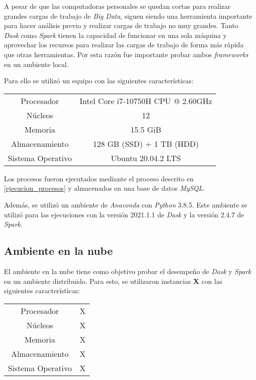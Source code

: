 A pesar de que las computadoras personales se quedan cortas para realizar grandes cargas de trabajo de \textit{Big Data}, siguen siendo una herramienta importante para hacer análisis previo y realizar cargas de trabajo no muy grandes. Tanto \textit{Dask} como \textit{Spark} tienen la capacidad de funcionar en una sola máquina y aprovechar los recursos para realizar las cargas de trabajo de forma más rápida que otras herramientas. Por esta razón fue importante probar ambos \textit{frameworks} en un ambiente local. 

Para ello se utilizó un equipo con las siguientes características:

\begin{center}
\begin{tabular}{|c|c|}
 \hline
  Procesador & Intel Core i7-10750H CPU @ 2.60GHz \\ 
  Núcleos & 12 \\
  Memoria & 15.5 GiB \\ 
  Almacenamiento & 128 GB (SSD) + 1 TB (HDD) \\ 
  Sistema Operativo & Ubuntu 20.04.2 LTS \\
  \hline
\end{tabular}
\end{center}

Los procesos fueron ejecutados mediante el proceso descrito en \ref{ejecucion_procesos} y almacenados en una base de datos \textit{MySQL}.

Además, se utilizó un ambiente de \textit{Anaconda} con \textit{Python} 3.8.5. Este ambiente se utilizó para las ejecuciones con la versión 2021.1.1 de \textit{Dask} y la versión 2.4.7 de \textit{Spark}. 

\subsection{Ambiente en la nube}

El ambiente en la nube tiene como objetivo probar el desempeño de \textit{Dask} y \textit{Spark} en un ambiente distribuido. Para esto, se utilizaron instancias \textbf{X} con las siguientes características:

\begin{center}
\begin{tabular}{|c|c|}
 \hline
  Procesador & X \\ 
  Núcleos & X \\
  Memoria & X \\ 
  Almacenamiento & X \\ 
  Sistema Operativo & X \\
  \hline
\end{tabular}
\end{center}

